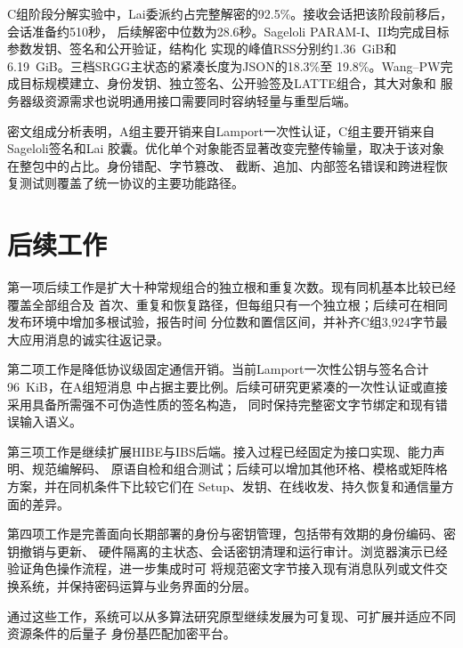 C组阶段分解实验中，Lai委派约占完整解密的92.5\%。接收会话把该阶段前移后，会话准备约510秒，
后续解密中位数为28.6秒。Sageloli PARAM-I、II均完成目标参数发钥、签名和公开验证，结构化
实现的峰值RSS分别约1.36~GiB和6.19~GiB。三档SRGG主状态的紧凑长度为JSON的18.3\%至
19.8\%。Wang--PW完成目标规模建立、身份发钥、独立签名、公开验签及LATTE组合，其大对象和
服务器级资源需求也说明通用接口需要同时容纳轻量与重型后端。

密文组成分析表明，A组主要开销来自Lamport一次性认证，C组主要开销来自Sageloli签名和Lai
胶囊。优化单个对象能否显著改变完整传输量，取决于该对象在整包中的占比。身份错配、字节篡改、
截断、追加、内部签名错误和跨进程恢复测试则覆盖了统一协议的主要功能路径。

\section{后续工作}

第一项后续工作是扩大十种常规组合的独立根和重复次数。现有同机基本比较已经覆盖全部组合及
首次、重复和恢复路径，但每组只有一个独立根；后续可在相同发布环境中增加多根试验，报告时间
分位数和置信区间，并补齐C组3,924字节最大应用消息的诚实往返记录。

第二项工作是降低协议级固定通信开销。当前Lamport一次性公钥与签名合计96~KiB，在A组短消息
中占据主要比例。后续可研究更紧凑的一次性认证或直接采用具备所需强不可伪造性质的签名构造，
同时保持完整密文字节绑定和现有错误输入语义。

第三项工作是继续扩展HIBE与IBS后端。接入过程已经固定为接口实现、能力声明、规范编解码、
原语自检和组合测试；后续可以增加其他环格、模格或矩阵格方案，并在同机条件下比较它们在
Setup、发钥、在线收发、持久恢复和通信量方面的差异。

第四项工作是完善面向长期部署的身份与密钥管理，包括带有效期的身份编码、密钥撤销与更新、
硬件隔离的主状态、会话密钥清理和运行审计。浏览器演示已经验证角色操作流程，进一步集成时可
将规范密文字节接入现有消息队列或文件交换系统，并保持密码运算与业务界面的分层。

通过这些工作，系统可以从多算法研究原型继续发展为可复现、可扩展并适应不同资源条件的后量子
身份基匹配加密平台。
